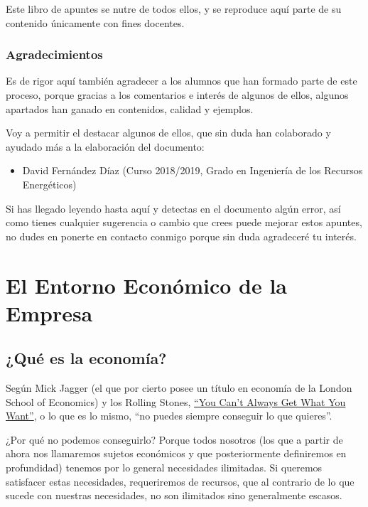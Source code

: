 \documentclass[
]{krantz}
\providecommand{\tightlist}{%
  \setlength{\itemsep}{0pt}\setlength{\parskip}{0pt}}
\begin{document}
Este libro de apuntes se nutre de todos ellos, y se reproduce aquí parte de su contenido únicamente con fines docentes.

\hypertarget{agradecimientos}{%
\section*{Agradecimientos}\label{agradecimientos}}


Es de rigor aquí también agradecer a los alumnos que han formado parte de este proceso, porque gracias a los comentarios e interés de algunos de ellos, algunos apartados han ganado en contenidos, calidad y ejemplos.

Voy a permitir el destacar algunos de ellos, que sin duda han colaborado y ayudado más a la elaboración del documento:

\begin{itemize}
\tightlist
\item
  David Fernández Díaz (Curso 2018/2019, Grado en Ingeniería de los Recursos Energéticos)
\end{itemize}

Si has llegado leyendo hasta aquí y detectas en el documento algún error, así como tienes cualquier sugerencia o cambio que crees puede mejorar estos apuntes, no dudes en ponerte en contacto conmigo porque sin duda agradeceré tu interés.

\mainmatter

\hypertarget{part-el-entorno-econuxf3mico-de-la-empresa}{%
\part{El Entorno Económico de la Empresa}\label{part-el-entorno-econuxf3mico-de-la-empresa}}

\hypertarget{quuxe9-es-la-economuxeda}{%
\chapter{¿Qué es la economía?}\label{quuxe9-es-la-economuxeda}}

Según Mick Jagger (el que por cierto posee un título en economía de la London School of Economics) y los Rolling Stones, \href{https://www.youtube.com/watch?v=oqMl5CRoFdk}{``You Can't Always Get What You Want''}, o lo que es lo mismo, ``no puedes siempre conseguir lo que quieres''.

¿Por qué no podemos conseguirlo? Porque todos nosotros (los que a partir de ahora nos llamaremos sujetos económicos y que posteriormente definiremos en profundidad) tenemos por lo general necesidades ilimitadas. Si queremos satisfacer estas necesidades, requeriremos de recursos, que al contrario de lo que sucede con nuestras necesidades, no son ilimitados sino generalmente escasos.
\end{document}
